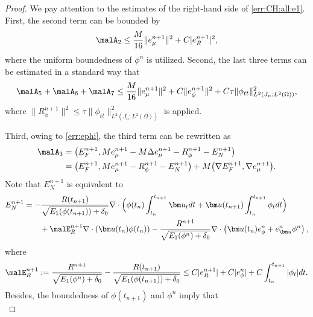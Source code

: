 \begin{proof}
	We pay attention to the estimates of the right-hand side of \eqref{err:CH:all:e1}. First, the second term can be bounded by
	\begin{equation*} 
		\malA_2\leq   \frac{M}{16}\|e_\mu^{n+1}\|^2+C|e_R^{n+1}|^2,
	\end{equation*}
	where the uniform boundedness of $\phi^n$ is utilized. Second, the last three terms can be estimated in a standard way that 
	\begin{equation*} 
		\malA_{5} + \malA_{6} +  \malA_{7}
		\le \frac{M}{16}\|e_\mu^{n+1}\|^2+ C\| e_\phi^{n+1}\|^2+ C\tau \|\phi_{tt}\|_{L^2(J_n ; L^2(\Omega))}^2,
	\end{equation*}
	where	$\|R_\phi^{n+1}\|^2 \le \tau \|\phi_{tt}\|_{L^2(J_n ; L^2(\Omega))}^2$ 	is applied.
	
	Third, owing to \eqref{err:ephi}, the third term can be rewritten as
	\begin{equation*}
		\begin{aligned}
			\malA_3
			&=\big(E_F^{n+1}, M e_\mu^{n+1}-M \Delta e_\mu^{n+1}-R_\phi^{n+1}-E_N^{n+1}\big) \\
			& =\big(E_F^{n+1}, M e_\mu^{n+1}-R_\phi^{n+1}-E_N^{n+1}\big)+M\big(\nabla E_F^{n+1}, \nabla e_\mu^{n+1}\big). %
		\end{aligned}
	\end{equation*}
	Note that $E_N^{n+1}$ is equivalent to  
	\begin{equation} \label{err:EN:all}
		\begin{aligned}
			E_N^{n+1} 
			& =  -\frac{R(t_{n+1})}{\sqrt{E_1(\phi(t_{n+1}))+\delta_0}}  
			\nabla \cdot\Big( \phi(t_n)\int_{t_n}^{t_{n+1}} \bm u_t dt+\bm u (t_{n+1}) \int_{t_n}^{t_{n+1}} \phi_t dt \Big) \\
			& \qquad  + \malE_R^{n+1} \nabla \cdot{\left(\bm u (t_{n}) \phi(t_{n})\right)} -\frac{R^{n+1}}{\sqrt{E_1(\phi^n)+\delta_0}} \nabla \cdot\left(\bm u (t_{n}) e_\phi^n+e_{\bm u }^n \phi^n\right),
		\end{aligned}
	\end{equation}
	where 
	\begin{equation} \label{err:Er}
		\malE_R^{n+1}:=\frac{R^{n+1}}{\sqrt{E_1(\phi^n)+\delta_0}}-\frac{R(t_{n+1})}{\sqrt{E_1(\phi(t_{n+1}))+\delta_0}} 
		\le C|e_R^{n+1}|+ C|e_\phi^n|  +C\int_{t_n}^{t_{n+1}}|\phi_t| dt.
	\end{equation}
	Besides, the boundedness of $\phi(t_{n+1})$ and $\phi^n$ imply that
	\begin{equation}  \label{err:E_F}

\end{equation}
\end{proof}
